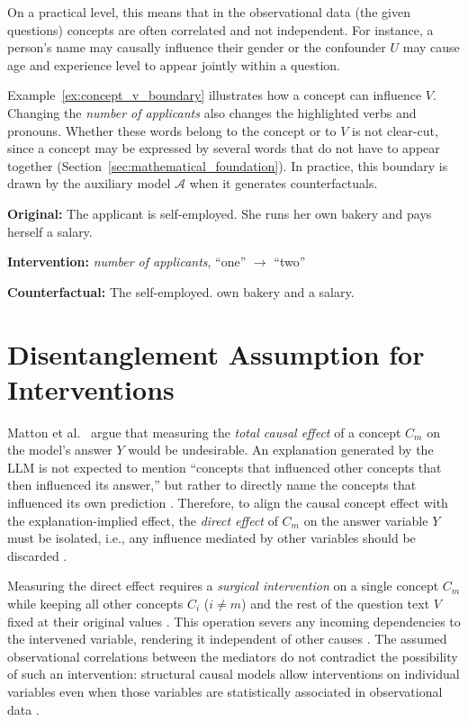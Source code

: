 On a practical level, this means that in the observational data (the given questions) concepts are often correlated and not independent. For instance, a person's name may causally influence their gender or the confounder $U$ may cause age and experience level to appear jointly within a question.

Example~\ref{ex:concept_v_boundary} illustrates how a concept can influence $V$. Changing the \textit{number of applicants} also changes the highlighted verbs and pronouns. Whether these words belong to the concept or to $V$ is not clear-cut, since a concept may be expressed by several words that do not have to appear together (Section~\ref{sec:mathematical_foundation}). In practice, this boundary is drawn by the auxiliary model $\mathcal{A}$ when it generates counterfactuals.

\begin{example_box}[label=ex:concept_v_boundary]
	\textbf{Original:} The applicant is self-employed. She runs her own bakery and pays herself a salary.

	\smallskip
	\textbf{Intervention:} \textit{number of applicants}, \enquote{one} $\rightarrow$ \enquote{two}

	\smallskip
	\textbf{Counterfactual:} The   self-employed.    own bakery and   a salary.
\end{example_box}

\section{Disentanglement Assumption for Interventions}

Matton et al.~\cite{mattonWalkTalkMeasuring2024} argue that measuring the \emph{total causal effect} of a concept $C_m$ on the model's answer $Y$ would be undesirable. An explanation generated by the LLM is not expected to mention \enquote{concepts that influenced other concepts that then influenced its answer,} but rather to directly name the concepts that influenced its own prediction \cite{mattonWalkTalkMeasuring2024}. Therefore, to align the causal concept effect with the explanation-implied effect, the \emph{direct effect} of $C_m$ on the answer variable $Y$ must be isolated, i.e., any influence mediated by other variables should be discarded \cite{pearlCausality2009}.

Measuring the direct effect requires a \emph{surgical intervention} on a single concept $C_m$ while keeping all other concepts $C_i$ ($i \neq m$) and the rest of the question text $V$ fixed at their original values \cite{pearlCausality2009}. This operation severs any incoming dependencies to the intervened variable, rendering it independent of other causes \cite{pearlCausality2009, eberhardtInterventionsCausalInference2007}. The assumed observational correlations between the mediators do not contradict the possibility of such an intervention: structural causal models allow interventions on individual variables even when those variables are statistically associated in observational data \cite{pearlCausality2009}.

